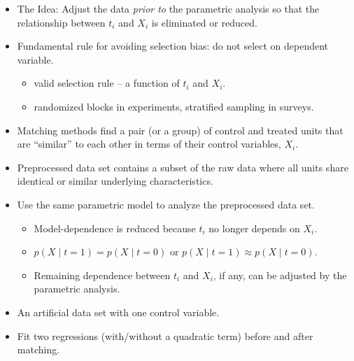 \documentclass[20pt,landscape,pdftex]{foils}
\begin{document}

\hypersetup{pdfpagetransition=Replace}

\begin{itemize}
\item The Idea: Adjust the data {\it prior to} the parametric analysis
  so that the relationship between $t_i$ and $X_i$ is eliminated or
  reduced.\pause
  
\item Fundamental rule for avoiding selection bias: do not select on
  dependent variable.\pause
  \begin{itemize}
  \item valid selection rule -- a function of $t_i$ and $X_i$.\pause 
  \item randomized blocks in experiments, stratified sampling in
    surveys.\pause
  \end{itemize}

\item Matching methods find a pair (or a group) of control and treated
  units that are ``similar'' to each other in terms of their control
  variables, $X_i$.

\item Preprocessed data set contains a subset of the raw data where
  all units share identical or similar underlying characteristics.\pause

\item Use the same parametric model to analyze the preprocessed data
  set.\pause 
  \begin{itemize}
  \item Model-dependence is reduced because $t_i$ no longer depends on
    $X_i$.\pause
  \item $p(X \mid t=1) = p(X \mid t=0)$ or $p(X \mid t=1) \approx
    p(X\mid t=0)$.\pause
  \item Remaining dependence between $t_i$ and $X_i$, if any, can be
    adjusted by the parametric analysis.\pause
  \end{itemize}
  

\end{itemize}



\hypersetup{pdfpagetransition=Replace}

\begin{itemize}
\item An artificial data set with one control variable.\pause
\item Fit two regressions (with/without a quadratic term) before and
  after matching.\pause
\end{itemize}
\end{document}
